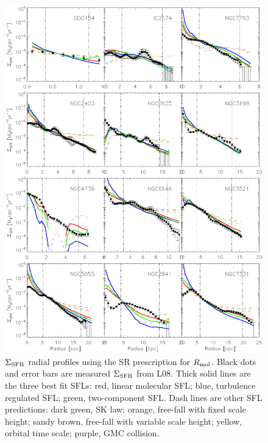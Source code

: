 \documentclass[12pt,preprint]{aastex}
\begin{document}
\begin{figure}
\begin{center}
\includegraphics[scale=0.7]{SFR_s.eps}  \caption{$\Sigma_{\rm SFR}$ radial profiles using the SR prescription for $R_{\rm mol}$. Black dots and error bars are measured $\Sigma_{\rm SFR}$ from L08. Thick solid lines are the three best fit SFLs: red, linear molecular SFL; blue, turbulence regulated SFL; green, two-component SFL.  Dash lines are other  SFL predictions: dark green, SK law; orange, free-fall with fixed scale height; sandy brown, free-fall with variable scale height; yellow, orbital time scale; purple, GMC collision.}
\label{SFR_s}
\end{center}
\end{figure}
\end{document}
